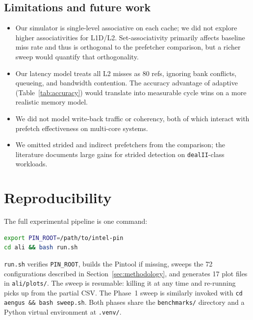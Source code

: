 \documentclass[11pt,letterpaper]{article}
\begin{document}
\subsection{Limitations and future work}
\begin{itemize}
  \item Our simulator is single-level associative on each cache; we did
        not explore higher associativities for L1D/L2. Set-associativity
        primarily affects baseline miss rate and thus is orthogonal to
        the prefetcher comparison, but a richer sweep would quantify
        that orthogonality.
  \item Our latency model treats all L2 misses as $80$ refs, ignoring
        bank conflicts, queueing, and bandwidth contention. The accuracy
        advantage of adaptive (Table~\ref{tab:accuracy}) would translate
        into measurable cycle wins on a more realistic memory model.
  \item We did not model write-back traffic or coherency, both of which
        interact with prefetch effectiveness on multi-core systems.
  \item We omitted strided and indirect prefetchers from the comparison;
        the literature documents large gains for strided detection on
        \texttt{dealII}-class workloads.
\end{itemize}

\section{Reproducibility}
The full experimental pipeline is one command:

\begin{lstlisting}[language=bash]
export PIN_ROOT=/path/to/intel-pin
cd ali && bash run.sh
\end{lstlisting}

\noindent
\texttt{run.sh} verifies \texttt{PIN\_ROOT}, builds the Pintool if missing,
sweeps the 72 configurations described in Section~\ref{sec:methodology},
and generates 17 plot files in \texttt{ali/plots/}. The sweep is
resumable: killing it at any time and re-running picks up from the
partial CSV. The Phase~1 sweep is similarly invoked with
\texttt{cd aengus \&\& bash sweep.sh}. Both phases share the
\texttt{benchmarks/} directory and a Python virtual environment at
\texttt{.venv/}.
\end{document}
